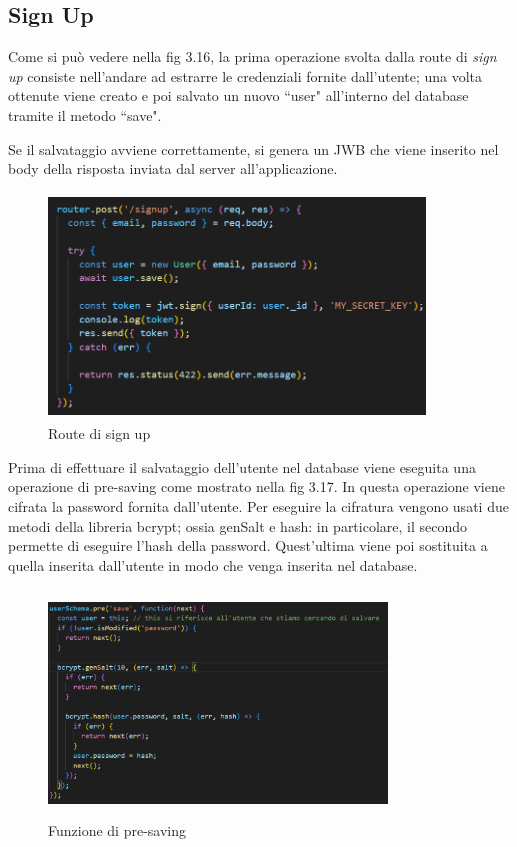 \subsection*{Sign Up}
Come si pu\`o vedere nella fig 3.16, la prima operazione svolta dalla route di \textit{sign up} consiste nell'andare ad estrarre le credenziali
fornite dall'utente; una volta ottenute viene creato e poi salvato un nuovo ``user" all'interno del database tramite il metodo ``save".

Se il salvataggio avviene correttamente, si genera un JWB che viene inserito nel body della risposta inviata dal server all'applicazione.
\begin{figure}[h]
    \centering
    \includegraphics[width=10cm, height=6cm]{images/signUpServer.png}
    \caption[differenzeiteot]{Route di sign up}
    \label{fig:sign up}
\end{figure}

Prima di effettuare il salvataggio dell'utente nel database viene eseguita una operazione di pre-saving come mostrato nella fig 3.17. In questa operazione viene cifrata la password fornita dall'utente.
Per eseguire la cifratura vengono usati due metodi della libreria bcrypt; ossia genSalt e hash: in particolare, il secondo permette di eseguire l'hash
della password. Quest'ultima viene poi sostituita a quella inserita dall'utente in modo che venga inserita nel database.

\begin{figure}[h]
    \centering
    \includegraphics[width=9cm, height=6cm]{images/preSaveFunction.png}
    \caption[differenzeiteot]{Funzione di pre-saving}
    \label{fig:pre-saving}
\end{figure}


